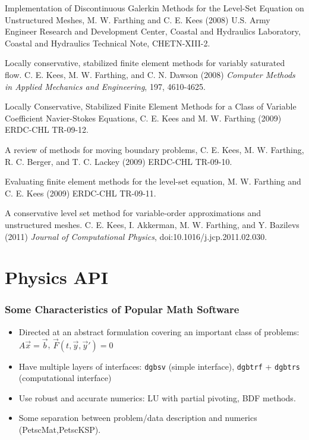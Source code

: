 \documentclass{beamer}
\begin{document}
\begin{frame}
\bit
\footnotesize
\item Implementation of Discontinuous Galerkin Methods for the
  Level-Set Equation on Unstructured Meshes, M. W. Farthing and C. E.
  Kees (2008) U.S. Army Engineer Research and Development Center,
  Coastal and Hydraulics Laboratory, Coastal and Hydraulics Technical
  Note, CHETN-XIII-2.

\item Locally conservative, stabilized finite element methods for
  variably saturated flow. C. E. Kees, M. W. Farthing, and C. N.
  Dawson (2008) {\em Computer Methods in Applied Mechanics and
    Engineering}, 197, 4610-4625.

\item Locally Conservative, Stabilized Finite Element Methods for a
  Class of Variable Coefficient Navier-Stokes Equations, C. E. Kees
  and M. W. Farthing (2009) ERDC-CHL TR-09-12.

\item A review of methods for moving boundary problems, C. E. Kees,
  M. W. Farthing, R. C. Berger, and T. C. Lackey (2009) ERDC-CHL
  TR-09-10.

\item Evaluating finite element methods for the level-set equation,
  M. W. Farthing and C. E. Kees (2009) ERDC-CHL TR-09-11.

\item A conservative level set method for variable-order
  approximations and unstructured meshes. C. E. Kees, I. Akkerman,
  M. W. Farthing, and Y. Bazilevs (2011) {\em Journal of Computational
    Physics}, doi:10.1016/j.jcp.2011.02.030.
\eit
\end{frame}

\section{Physics API}

\begin{frame}
\frametitle{Some Characteristics of Popular Math Software}
\begin{itemize}
\item Directed at an abstract formulation covering an important class
  of problems: $A \vec x = \vec b$, $\vec F(t,\vec y, \vec y') = 0$
\item Have multiple layers of interfaces: \texttt{dgbsv} (simple
  interface), \texttt{dgbtrf} + \texttt{dgbtrs} (computational
  interface)
\item Use robust and accurate numerics: LU with partial pivoting, BDF
  methods.
\item Some separation between problem/data description and numerics
  (PetscMat,PetscKSP).
\end{itemize}
\end{frame}
\end{document}
